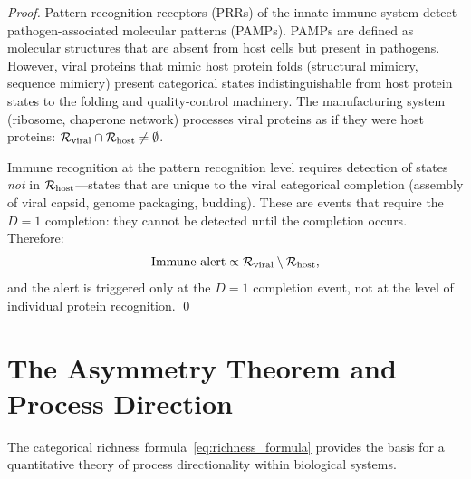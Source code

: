 \begin{proof}
Pattern recognition receptors (PRRs) of the innate immune system detect
pathogen-associated molecular patterns (PAMPs). PAMPs are defined as molecular
structures that are absent from host cells but present in pathogens. However,
viral proteins that mimic host protein folds (structural mimicry, sequence
mimicry) present categorical states indistinguishable from host protein states
to the folding and quality-control machinery. The manufacturing system
(ribosome, chaperone network) processes viral proteins as if they were host
proteins: $\mathcal{R}_{\mathrm{viral}} \cap \mathcal{R}_{\mathrm{host}} \neq \emptyset$.

Immune recognition at the pattern recognition level requires detection of
states \emph{not} in $\mathcal{R}_{\mathrm{host}}$---states that are unique to the
viral categorical completion (assembly of viral capsid, genome packaging,
budding). These are events that require the $D=1$ completion: they cannot
be detected until the completion occurs. Therefore:
\begin{equation}
  \text{Immune alert} \propto \mathcal{R}_{\mathrm{viral}} \setminus \mathcal{R}_{\mathrm{host}},
  \label{eq:immune_alert}
\end{equation}
and the alert is triggered only at the $D=1$ completion event, not at the
level of individual protein recognition. \qed
\end{proof}

\section{The Asymmetry Theorem and Process Direction}
\label{sec:asymmetry}

The categorical richness formula~\eqref{eq:richness_formula} provides the
basis for a quantitative theory of process directionality within biological
systems.

